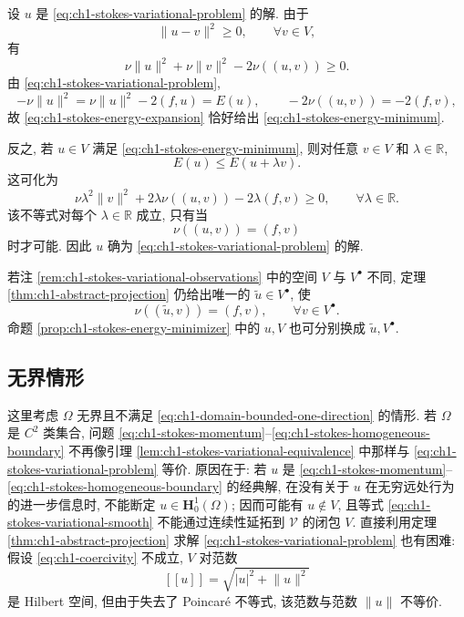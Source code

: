 \begin{Proof}
设 $u$ 是 \eqref{eq:ch1-stokes-variational-problem} 的解. 由于
\[
\lVert u-v\rVert^2\geq0,\qquad\forall v\in V,
\]
有
\begin{equation}
\nu\lVert u\rVert^2+\nu\lVert v\rVert^2-2\nu((u,v))\geq0.
\label{eq:ch1-stokes-energy-expansion}
\end{equation}
由 \eqref{eq:ch1-stokes-variational-problem},
\[
-\nu\lVert u\rVert^2
=\nu\lVert u\rVert^2-2(f,u)=E(u),
\qquad
-2\nu((u,v))=-2(f,v),
\]
故 \eqref{eq:ch1-stokes-energy-expansion} 恰好给出 \eqref{eq:ch1-stokes-energy-minimum}.

反之, 若 $u\in V$ 满足 \eqref{eq:ch1-stokes-energy-minimum}, 则对任意 $v\in V$ 和 $\lambda\in\mathbb R$,
\[
E(u)\leq E(u+\lambda v).
\]
这可化为
\begin{equation}
\nu\lambda^2\lVert v\rVert^2
+2\lambda\nu((u,v))-2\lambda(f,v)\geq0,
\qquad\forall\lambda\in\mathbb R.
\label{eq:ch1-stokes-energy-quadratic}
\end{equation}
该不等式对每个 $\lambda\in\mathbb R$ 成立, 只有当
\[
\nu((u,v))=(f,v)
\]
时才可能. 因此 $u$ 确为 \eqref{eq:ch1-stokes-variational-problem} 的解.
\end{Proof}

\begin{Remark}
\label{rem:ch1-stokes-vbullet-problem}
若注 \ref{rem:ch1-stokes-variational-observations} 中的空间 $V$ 与 $V^\bullet$ 不同, 定理 \ref{thm:ch1-abstract-projection} 仍给出唯一的 $\widetilde u\in V^\bullet$, 使
\begin{equation}
\nu((\widetilde u,v))=(f,v),\qquad\forall v\in V^\bullet.
\label{eq:ch1-stokes-vbullet-variational}
\end{equation}
命题 \ref{prop:ch1-stokes-energy-minimizer} 中的 $u,V$ 也可分别换成 $\widetilde u,V^\bullet$.
\end{Remark}
\subsection{无界情形}
\label{subsec:ch1-stokes-unbounded-domain}

这里考虑 $\Omega$ 无界且不满足 \eqref{eq:ch1-domain-bounded-one-direction} 的情形. 若 $\Omega$ 是 $C^2$ 类集合, 问题 \eqref{eq:ch1-stokes-momentum}--\eqref{eq:ch1-stokes-homogeneous-boundary} 不再像引理 \ref{lem:ch1-stokes-variational-equivalence} 中那样与 \eqref{eq:ch1-stokes-variational-problem} 等价. 原因在于: 若 $u$ 是 \eqref{eq:ch1-stokes-momentum}--\eqref{eq:ch1-stokes-homogeneous-boundary} 的经典解, 在没有关于 $u$ 在无穷远处行为的进一步信息时, 不能断定 $u\in\mathbf H_0^1(\Omega)$; 因而可能有 $u\notin V$, 且等式 \eqref{eq:ch1-stokes-variational-smooth} 不能通过连续性延拓到 $\mathcal V$ 的闭包 $V$. 直接利用定理 \ref{thm:ch1-abstract-projection} 求解 \eqref{eq:ch1-stokes-variational-problem} 也有困难: 假设 \eqref{eq:ch1-coercivity} 不成立, $V$ 对范数
\[
[[u]]=\sqrt{|u|^2+\lVert u\rVert^2}
\]
是 Hilbert 空间, 但由于失去了 Poincaré 不等式, 该范数与范数 $\lVert u\rVert$ 不等价.

